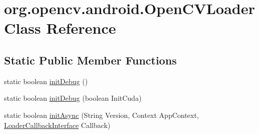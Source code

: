 \hypertarget{classorg_1_1opencv_1_1android_1_1_open_c_v_loader}{}\section{org.\+opencv.\+android.\+Open\+C\+V\+Loader Class Reference}
\label{classorg_1_1opencv_1_1android_1_1_open_c_v_loader}
\subsection*{Static Public Member Functions}
\begin{DoxyCompactItemize}
\item 
static boolean \mbox{\hyperlink{classorg_1_1opencv_1_1android_1_1_open_c_v_loader_a3ebbc18d01776b8a074a6d7c702071e0}{init\+Debug}} ()
\item 
static boolean \mbox{\hyperlink{classorg_1_1opencv_1_1android_1_1_open_c_v_loader_a1c075b7bd3e4d8d71de2ffc0f94d3371}{init\+Debug}} (boolean Init\+Cuda)
\item 
static boolean \mbox{\hyperlink{classorg_1_1opencv_1_1android_1_1_open_c_v_loader_aab2af8ac86f7b9589e12f25313e51040}{init\+Async}} (String Version, Context App\+Context, \mbox{\hyperlink{interfaceorg_1_1opencv_1_1android_1_1_loader_callback_interface}{Loader\+Callback\+Interface}} Callback)
\end{DoxyCompactItemize}
